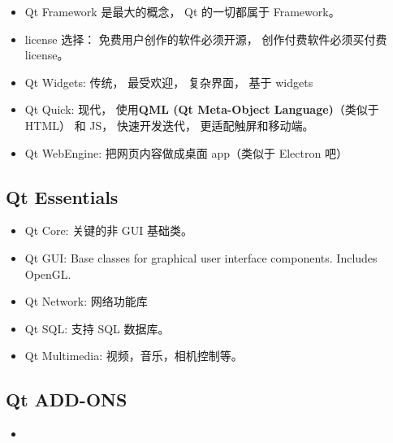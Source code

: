 
\begin{issues}
\issueDraft
\end{issues}

\begin{itemize}
\item Qt Framework 是最大的概念， Qt 的一切都属于 Framework。
\item license 选择： 免费用户创作的软件必须开源， 创作付费软件必须买付费 license。
\item Qt Widgets: 传统， 最受欢迎， 复杂界面， 基于 widgets
\item Qt Quick: 现代， 使用\textbf{QML (Qt Meta-Object Language)}（类似于 HTML） 和 JS， 快速开发迭代， 更适配触屏和移动端。
\item Qt WebEngine: 把网页内容做成桌面 app（类似于 Electron 吧）
\end{itemize}


\subsection{Qt Essentials}
\begin{itemize}
\item Qt Core: 关键的非 GUI 基础类。
\item Qt GUI: Base classes for graphical user interface components. Includes OpenGL.
\item Qt Network: 网络功能库
\item Qt SQL: 支持 SQL 数据库。
\item Qt Multimedia: 视频，音乐，相机控制等。
\end{itemize}

\subsection{Qt ADD-ONS}
\begin{itemize}
\item 
\end{itemize}
